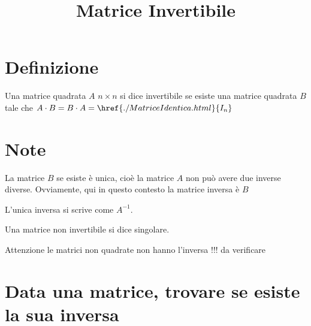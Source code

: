 \documentclass[a4paper,10pt]{article}
\title{Matrice Invertibile}
\author{}
\begin{document}
\maketitle

\begin{abstract}

\end{abstract}

\section{Definizione}
Una matrice quadrata $A$ $n \times n$ si dice invertibile se esiste una matrice quadrata $B$ tale che $A \cdot B = B \cdot A = \href{./MatriceIdentica.html}{I_{n}}$

\section{Note}
La matrice $B$ se esiste è unica, cioè la matrice $A$ non può avere due inverse diverse. Ovviamente, qui in questo contesto la matrice inversa è $B$

L'unica inversa si scrive come $A^{-1}$.

Una matrice non invertibile si dice singolare.

Attenzione le matrici non quadrate non hanno l'inversa !!! da verificare

\section{Data una matrice, trovare se esiste la sua inversa}
\end{document}
